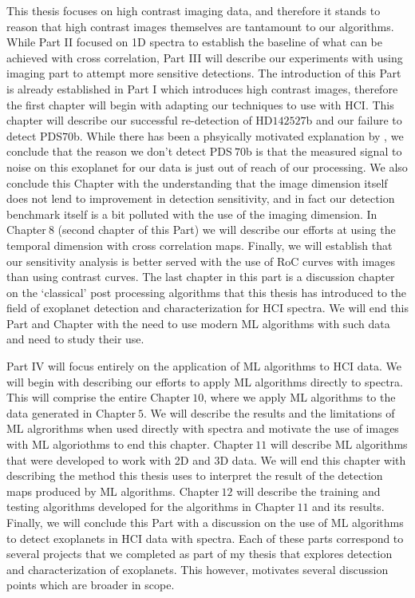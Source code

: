 This thesis focuses on high contrast imaging data, and therefore it stands to reason that high contrast images themselves are tantamount to our algorithms.
While Part II focused on 1D spectra to establish the baseline of what can be achieved with cross correlation, Part III will describe our experiments with using imaging part to attempt more sensitive detections.
The introduction of this Part is already established in Part I which introduces high contrast images, therefore the first chapter will begin with adapting our techniques to use with HCI.
This chapter will describe our successful re-detection of HD$142527$b and our failure to detect PDS$70$b. 
While there has been a phsyically motivated explanation by \cite{2023Cugno}, we conclude that the reason we don't detect PDS$~70$b is that the measured signal to noise on this exoplanet for our data is just out of reach of our processing.
We also conclude this Chapter with the understanding that the image dimension itself does not lend to improvement in detection sensitivity, and in fact our detection benchmark itself is a bit polluted with the use of the imaging dimension.
In Chapter$~8$ (second chapter of this Part) we will describe our efforts at using the temporal dimension with cross correlation maps. 
Finally, we will establish that our sensitivity analysis is better served with the use of RoC curves with images than using contrast curves.
The last chapter in this part is a discussion chapter on the `classical' post processing algorithms that this thesis has introduced to the field of exoplanet detection and characterization for HCI spectra.
We will end this Part and Chapter with the need to use modern ML algorithms with such data and need to study their use.

Part IV will focus entirely on the application of ML algorithms to HCI data.
We will begin with describing our efforts to apply ML algorithms directly to spectra. 
This will comprise the entire Chapter$~10$, where we apply ML algorithms to the data generated in Chapter$~5$. 
We will describe the results and the limitations of ML algrorithms when used directly with spectra and motivate the use of images with ML algoriothms to end this chapter.
Chapter$~11$ will describe ML algorithms that were developed to work with 2D and 3D data.
We will end this chapter with describing the method this thesis uses to interpret the result of the detection maps produced by ML algorithms.
Chapter$~12$ will describe the training and testing algorithms developed for the algorithms in Chapter$~11$ and its results. 
Finally, we will conclude this Part with a discussion on the use of ML algorithms to detect exoplanets in HCI data with spectra.
Each of these parts correspond to several projects that we completed as part of my thesis that explores detection and characterization of exoplanets.
This however, motivates several discussion points which are broader in scope.

